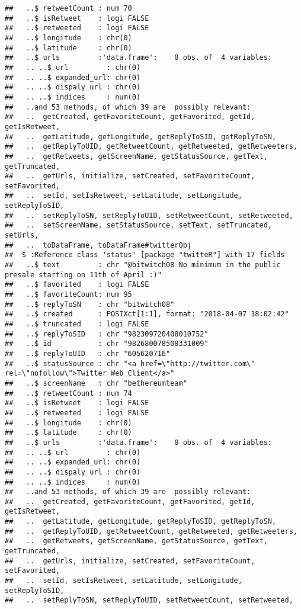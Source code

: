 \documentclass[]{article}
\begin{document}
\begin{verbatim}
##   ..$ retweetCount : num 70
##   ..$ isRetweet    : logi FALSE
##   ..$ retweeted    : logi FALSE
##   ..$ longitude    : chr(0) 
##   ..$ latitude     : chr(0) 
##   ..$ urls         :'data.frame':    0 obs. of  4 variables:
##   .. ..$ url         : chr(0) 
##   .. ..$ expanded_url: chr(0) 
##   .. ..$ dispaly_url : chr(0) 
##   .. ..$ indices     : num(0) 
##   ..and 53 methods, of which 39 are  possibly relevant:
##   ..  getCreated, getFavoriteCount, getFavorited, getId, getIsRetweet,
##   ..  getLatitude, getLongitude, getReplyToSID, getReplyToSN,
##   ..  getReplyToUID, getRetweetCount, getRetweeted, getRetweeters,
##   ..  getRetweets, getScreenName, getStatusSource, getText, getTruncated,
##   ..  getUrls, initialize, setCreated, setFavoriteCount, setFavorited,
##   ..  setId, setIsRetweet, setLatitude, setLongitude, setReplyToSID,
##   ..  setReplyToSN, setReplyToUID, setRetweetCount, setRetweeted,
##   ..  setScreenName, setStatusSource, setText, setTruncated, setUrls,
##   ..  toDataFrame, toDataFrame#twitterObj
##  $ :Reference class 'status' [package "twitteR"] with 17 fields
##   ..$ text         : chr "@bitwitch08 No minimum in the public presale starting on 11th of April :)"
##   ..$ favorited    : logi FALSE
##   ..$ favoriteCount: num 95
##   ..$ replyToSN    : chr "bitwitch08"
##   ..$ created      : POSIXct[1:1], format: "2018-04-07 18:02:42"
##   ..$ truncated    : logi FALSE
##   ..$ replyToSID   : chr "982309720408010752"
##   ..$ id           : chr "982680078508331009"
##   ..$ replyToUID   : chr "605620716"
##   ..$ statusSource : chr "<a href=\"http://twitter.com\" rel=\"nofollow\">Twitter Web Client</a>"
##   ..$ screenName   : chr "bethereumteam"
##   ..$ retweetCount : num 74
##   ..$ isRetweet    : logi FALSE
##   ..$ retweeted    : logi FALSE
##   ..$ longitude    : chr(0) 
##   ..$ latitude     : chr(0) 
##   ..$ urls         :'data.frame':    0 obs. of  4 variables:
##   .. ..$ url         : chr(0) 
##   .. ..$ expanded_url: chr(0) 
##   .. ..$ dispaly_url : chr(0) 
##   .. ..$ indices     : num(0) 
##   ..and 53 methods, of which 39 are  possibly relevant:
##   ..  getCreated, getFavoriteCount, getFavorited, getId, getIsRetweet,
##   ..  getLatitude, getLongitude, getReplyToSID, getReplyToSN,
##   ..  getReplyToUID, getRetweetCount, getRetweeted, getRetweeters,
##   ..  getRetweets, getScreenName, getStatusSource, getText, getTruncated,
##   ..  getUrls, initialize, setCreated, setFavoriteCount, setFavorited,
##   ..  setId, setIsRetweet, setLatitude, setLongitude, setReplyToSID,
##   ..  setReplyToSN, setReplyToUID, setRetweetCount, setRetweeted,

\end{verbatim}
\end{document}
